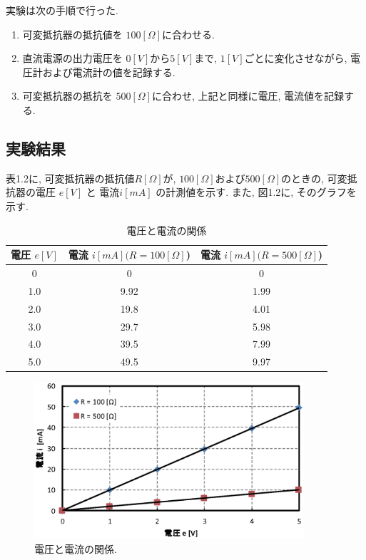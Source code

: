 \documentclass[a4paper,10pt]{jsarticle}
\begin{document}
			実験は次の手順で行った.
			
			\begin{enumerate}
			\item 可変抵抗器の抵抗値を $100[\Omega]$に合わせる.
			\item 直流電源の出力電圧を $0[V]$から$5[V]$まで,  $1[V]$ごとに変化させながら,  電圧計および電流計の値を記録する.
			\item 可変抵抗器の抵抗を $500[\Omega]$に合わせ,  上記と同様に電圧,  電流値を記録する.
			\end{enumerate}
			
		\subsection{実験結果}
			表1.2に,  可変抵抗器の抵抗値$R[\Omega]$が,  $100 [\Omega]$および$500 [\Omega]$のときの,  可変抵抗器の電圧 $e[V]$ と 電流$i[mA]$ の計測値を示す.  また,  図1.2に,  そのグラフを示す.
			\begin{table}[h]
			\caption{電圧と電流の関係}
				\label{relation}
				\begin{center}
				\begin{tabular}{|c|c|c|}\hline
				電圧 $e[V]$ & 電流 $i[mA] (R = 100 [\Omega]$) & 電流 $i[mA] (R = 500 [\Omega]$)  \\ \hline
				0 & 0 & 0 \\ \hline
				1.0 & 9.92 & 1.99 \\ \hline
				2.0 & 19.8 & 4.01 \\ \hline
				3.0 & 29.7 & 5.98 \\ \hline
				4.0 & 39.5 & 7.99 \\ \hline
				5.0 & 49.5 & 9.97 \\ \hline
				\end{tabular}
				\end{center}
			\end{table}
			
			\begin{figure}[h]
			\begin{center}
			\includegraphics[width=10cm]{ohmu2.eps}
			\end{center}
			\caption[]{電圧と電流の関係. }
			\label{circuit}
			\end{figure}
			
\end{document}
